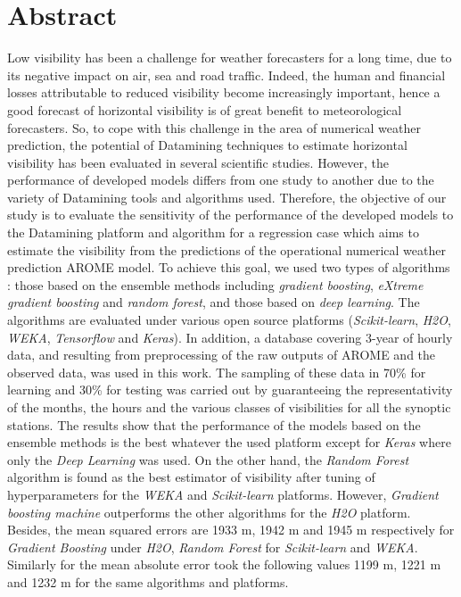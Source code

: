 \chapter*{Abstract}
\mtcaddchapter[Abstract]
\label{chap:Abstract}
Low visibility has been a challenge for weather forecasters for a long time, due to its negative impact on air, sea and road traffic. Indeed, the human and financial losses attributable to reduced visibility become increasingly important, hence a good forecast of horizontal visibility is of great benefit to meteorological forecasters. So, to cope with this challenge in the area of numerical weather prediction, the potential of Datamining techniques to estimate horizontal visibility has been evaluated in several scientific studies. However, the performance of developed models differs from one study to another due to the variety of Datamining tools and algorithms used. Therefore, the objective of our study is to evaluate the sensitivity of the performance of the developed models to the Datamining platform and algorithm for a regression case which aims to estimate the visibility from the predictions of the operational numerical weather prediction AROME model. To achieve this goal, we used two types of algorithms : those based on the ensemble methods including \textit{gradient boosting}, \textit{eXtreme gradient boosting} and \textit{random forest}, and those based on \textit{deep learning}. The algorithms are evaluated under various open source platforms (\textit{Scikit-learn}, \textit{H2O}, \textit{WEKA}, \textit{Tensorflow} and \textit{Keras}). In addition, a database covering 3-year of hourly data, and resulting from preprocessing of the raw outputs of AROME and the observed data, was used in this work. The sampling of these data in 70\% for learning and 30\% for testing was carried out by guaranteeing the representativity of the months, the hours and the various classes of visibilities for all the synoptic stations. The results show that the performance of the models based on the ensemble methods is the best whatever the used platform except for \textit{Keras} where only the \textit{Deep Learning} was used. On the other hand, the \textit{Random Forest} algorithm is found as the best estimator of visibility after tuning of hyperparameters for the \textit{WEKA} and \textit{Scikit-learn} platforms. However, \textit{Gradient boosting machine} outperforms the other algorithms for the \textit{H2O} platform. Besides, the mean squared errors are 1933 m, 1942 m and 1945 m respectively for \textit{Gradient Boosting} under \textit{H2O}, \textit{Random Forest} for \textit{Scikit-learn} and \textit{WEKA}. Similarly for the mean absolute error took the following values 1199 m, 1221 m and 1232 m for the same algorithms and platforms.